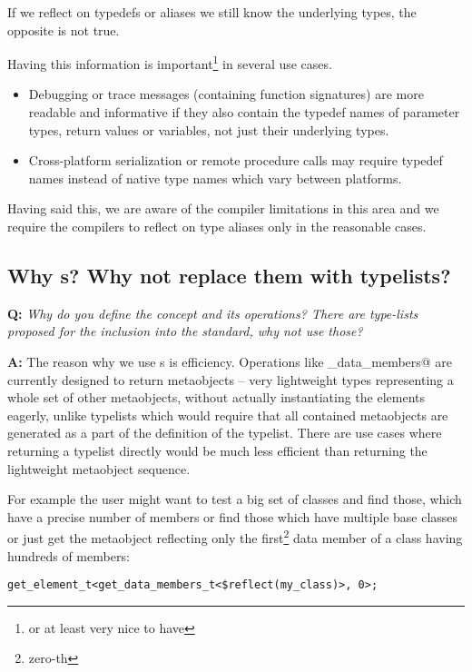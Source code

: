 If we reflect on typedefs or aliases we still know the underlying types,
the opposite is not true.  

Having this information is important\footnote{or at least very nice to have}
in several use cases.

\begin{itemize}
	\item Debugging or trace messages (containing function signatures)
		are more readable and informative if they also contain 
		the typedef names of parameter types, return values or variables,
		not just their underlying types.
	\item Cross-platform serialization or remote procedure calls may require
		typedef names instead of native type names which vary between
		platforms.
\end{itemize}

Having said this, we are aware of the compiler limitations in this area
and we require the compilers to reflect on type aliases only in the reasonable
cases.


\subsection{Why s? Why not replace them with typelists?}

\textbf{Q:} {\em Why do you define the  concept and its
operations? There are type-lists proposed for the inclusion into the standard,
why not use those?}

\textbf{A:} The reason why we use s is efficiency.
Operations like \verb@get_data_members@ are currently designed to return
metaobjects --  very lightweight types representing a whole set of
other metaobjects, without actually instantiating the elements eagerly,
unlike typelists which would require that all contained
metaobjects are generated as a part of the definition of the typelist.
There are use cases where returning a typelist directly would be much
less efficient than returning the lightweight metaobject sequence.

For example the user might want to test a big set of classes and find those,
which have a precise number of members or find those which have multiple base
classes or just get the metaobject reflecting only the first\footnote
{zero-th} data member of a class having hundreds of members:

\begin{verbatim}
get_element_t<get_data_members_t<$reflect(my_class)>, 0>;
\end{verbatim}

